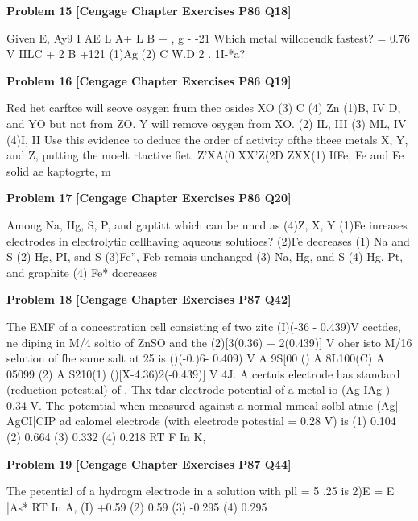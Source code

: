 \begin{problembox}
\textbf{Problem 15} \hfill \textbf{[Cengage Chapter Exercises P86 Q18]}
\label{q:ext-cng-th-15}

Given E,
Ay9 I AE
L A+
L B  + 
  ,
g - -21
Which metal willcoeudk fastest?
= 0.76 V
IILC  + 2
  B
+121
(1)Ag
(2) C 
W.D  2
 .
1I-*a?
\end{problembox}

\begin{problembox}
\textbf{Problem 16} \hfill \textbf{[Cengage Chapter Exercises P86 Q19]}
\label{q:ext-cng-th-16}

Red het carftce will seove osygen frum thec osides XO
(3) C
(4) Zn
(1)B, IV
  D,
and YO but not from ZO. Y will remove osygen from XO.
(2) IL, III
(3) ML, IV
(4)I, II
Use this evidence to deduce the order of activity ofthe theee
metals X, Y, and Z, putting the moelt rtactive fiet.
Z'XA(0 XX'Z(2D ZXX(1)
IfFe, Fe and Fe solid ae kaptogrte, m
\end{problembox}

\begin{problembox}
\textbf{Problem 17} \hfill \textbf{[Cengage Chapter Exercises P86 Q20]}
\label{q:ext-cng-th-17}

Among Na, Hg, S, P, and gaptitt which can be uncd as
(4)Z, X, Y
(1)Fe  inreases
electrodes in electrolytic cellhaving aqueous solutioes?
(2)Fe decreases
(1) Na and S
(2) Hg, PI, snd S
(3)Fe'', Feb remais unchanged
(3) Na, Hg, and S
(4) Hg. Pt, and graphite
(4) Fe* dccreases
\end{problembox}

\begin{problembox}
\textbf{Problem 18} \hfill \textbf{[Cengage Chapter Exercises P87 Q42]}
\label{q:ext-cng-th-18}

The EMF of a concestration cell consisting ef two zitc
(I)(-36 - 0.439)V
cectdes, ne diping in M/4 soltio of ZnSO and the
(2)[3(0.36) + 2(0.439)] V
oher isto M/16 selution of fhe same salt at 25  is
()(-0.)6- 0.409) V
A 9S[00 () A 8L100(C) A 05099 (2) A S210(1)
()[X-4.36)2(-0.439)] V
4J. A certuis electrode has standard (reduction potestial) of
. Thx tdar clectrode potential of a metal io (Ag IAg )
0.34 V. The potemtial when measured against a normal
mmeal-solbl atnie (Ag| AgCI|CIP ad
calomel electrode (with electrode potestial = 0.28 V) is
(1) 0.104
(2) 0.664
(3) 0.332
(4) 0.218
RT
F
In K,
\end{problembox}

\begin{problembox}
\textbf{Problem 19} \hfill \textbf{[Cengage Chapter Exercises P87 Q44]}
\label{q:ext-cng-th-19}

The petential of a hydrogm electrode in a solution with
pll = 5  .25  is
2)E = E |As*
RT
In A,
(I) +0.59
(2) 0.59
(3) -0.295
(4) 0.295
\end{problembox}

